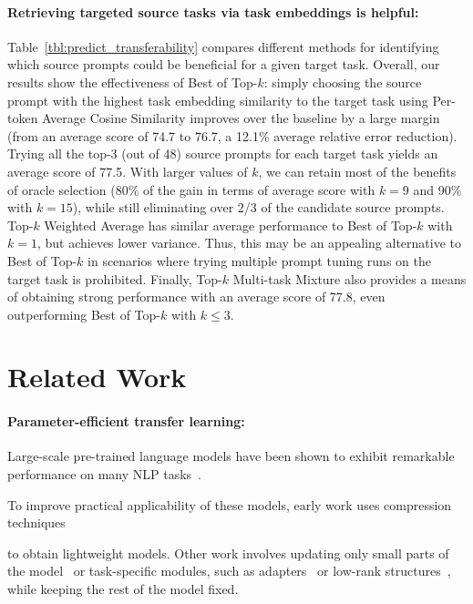 \paragraph{Retrieving targeted source tasks via task embeddings is helpful:}
Table~\ref{tbl:predict_transferability} compares different methods for identifying which source prompts could be beneficial for a given target task. Overall, our results show the effectiveness of {\small \sc Best of Top-$k$}: simply choosing the source prompt with the highest task embedding similarity to the target task using  {\small \sc Per-token Average Cosine Similarity} improves over the baseline by a large margin (from an average score of 74.7 to 76.7, a 12.1\% average relative error reduction). Trying all the top-3 (out of 48) source prompts for each target task yields an average score of 77.5. With larger values of $k$, we can retain most of the benefits of oracle selection 
(80\% of the gain in terms of average score with $k=9$ and 90\% with $k=15$), while still eliminating over 2/3 of the candidate source prompts. {\small \sc Top-$k$ Weighted Average} has similar average performance to {\small \sc Best of Top-$k$} with $k=1$, but achieves lower variance. Thus, this may be an appealing alternative to {\small \sc Best of Top-$k$} in scenarios where trying multiple prompt tuning runs on the target task is prohibited. Finally, {\small \sc Top-$k$ Multi-task Mixture} also provides a means of obtaining strong performance with an average score of 77.8, even outperforming {\small \sc Best of Top-$k$} with $k \leq 3$.

\section{Related Work}
\label{section:related_work}

\paragraph{Parameter-efficient transfer learning:} Large-scale pre-trained language models have been shown to exhibit remarkable performance on many NLP tasks~\cite{JDevlin19,YLiu19,ZYang19,ZLan20,CRaffel20,TBrown20,PHe21}.

To improve practical applicability of these models, early work uses compression techniques~\cite{VSanh19,XJiao20,AFan20,VSanh20}

to obtain lightweight models. Other work involves updating only small parts of the model~\cite{EZaken21} or task-specific modules, such as adapters~\cite{NHoulsby19,RMahabadi21a} or low-rank structures~\cite{RMahabadi21b,EHu21}, while keeping the rest of the model fixed.

